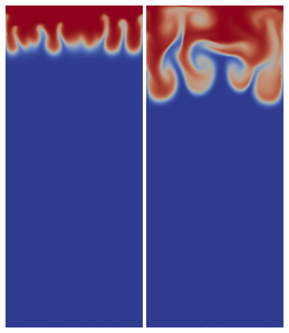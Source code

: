 \begin{frame}
\begin{figure}[H]
                \includegraphics[scale=0.2]{tephra_settling/tephra_fine_3.png}\hspace{0.1cm}
                \includegraphics[scale=0.2]{tephra_settling/tephra_fine_4.png}\hspace{0.1cm}

\end{figure}
\end{frame}

